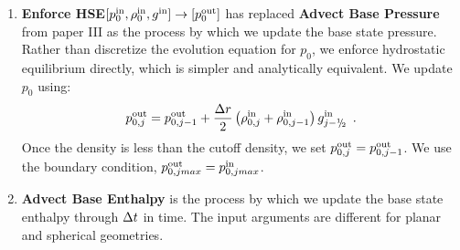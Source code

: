 \begin{enumerate}
\item {\bf Enforce HSE}$[p_0^{\mathrm{in}},\rho_0^{\mathrm{in}},g^{\mathrm{in}}] \rightarrow [p_0^{\mathrm{out}}]$
has replaced {\bf Advect Base Pressure} from paper III as the process by which we 
update the base state pressure.  Rather than discretize the evolution equation
for $p_0$, we enforce hydrostatic equilibrium directly, which is simpler and
analytically equivalent.  We update $p_0$ using:
\begin{equation}
p_{0,j}^{\outp} = p_{0,j-1}^{\outp} + 
\frac{\Delta r}{2}\left(\rho_{0,j}^{\inp}+\rho_{0,j-1}^{\inp}\right)g_{j-\myhalf}^{\inp}\enskip .
\end{equation}
Once the density is less than the cutoff density, we set $p_{0,j}^{\mathrm{out}} = p_{0,j-1}^{\mathrm{out}}$.
We use the boundary condition, $p_{0,jmax}^{\mathrm{out}} = p_{0,jmax}^{\mathrm{in}}$.

\item {\bf Advect Base Enthalpy}
is the process by which we update the base state enthalpy through $\Delta t$ in time.
The input arguments are different for planar and spherical geometries.
\end{enumerate}
